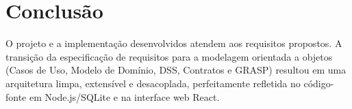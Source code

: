 \documentclass[12pt]{article}
\begin{document}
\section{Conclusão}

O projeto e a implementação desenvolvidos atendem aos requisitos propostos. A transição da especificação de requisitos para a modelagem orientada a objetos (Casos de Uso, Modelo de Domínio, DSS, Contratos e GRASP) resultou em uma arquitetura limpa, extensível e desacoplada, perfeitamente refletida no código-fonte em Node.js/SQLite e na interface web React.



\end{document}
